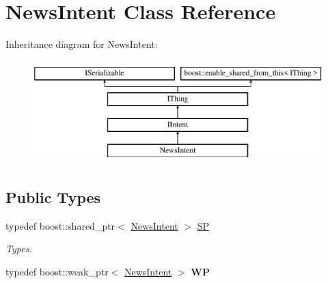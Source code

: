 \hypertarget{class_news_intent}{}\section{News\+Intent Class Reference}
\label{class_news_intent}
Inheritance diagram for News\+Intent\+:\begin{figure}[H]
\begin{center}
\leavevmode
\includegraphics[height=4.000000cm]{class_news_intent}
\end{center}
\end{figure}
\subsection*{Public Types}
\begin{DoxyCompactItemize}
\item 
\mbox{\label{class_news_intent_a3364b47d16dc8fe16bf88f6d26dbd4fa}} 
typedef boost\+::shared\+\_\+ptr$<$ \hyperlink{class_news_intent}{News\+Intent} $>$ \hyperlink{class_news_intent_a3364b47d16dc8fe16bf88f6d26dbd4fa}{SP}
\begin{DoxyCompactList}\small\item\em Types. \end{DoxyCompactList}\item 
\mbox{\label{class_news_intent_a2c2df0c7dae4bb49b17a996d2a171220}} 
typedef boost\+::weak\+\_\+ptr$<$ \hyperlink{class_news_intent}{News\+Intent} $>$ {\bfseries WP}
\end{DoxyCompactItemize}
